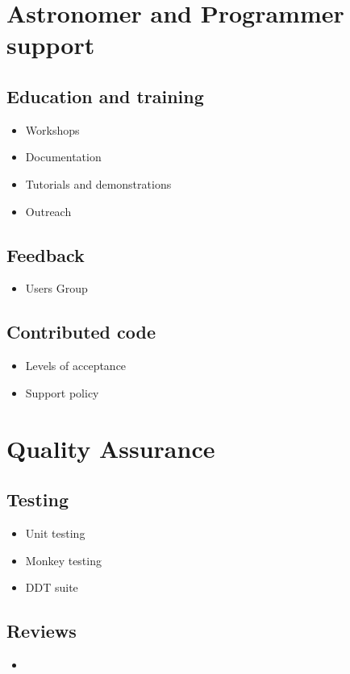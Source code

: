 \section{Astronomer and Programmer support}

\subsection{Education and training}
\begin{itemize}
\item Workshops
\item Documentation
\item Tutorials and demonstrations
\item Outreach
\end{itemize}

\subsection{Feedback}
\begin{itemize}
\item Users Group
\end{itemize}

\subsection{Contributed code}
\begin{itemize}
\item Levels of acceptance
\item Support policy
\end{itemize}


\section{Quality Assurance}

\subsection{Testing}
\begin{itemize}
\item Unit testing
\item Monkey testing
\item DDT suite
\end{itemize}

\subsection{Reviews}
\begin{itemize}
\item 
\end{itemize}


